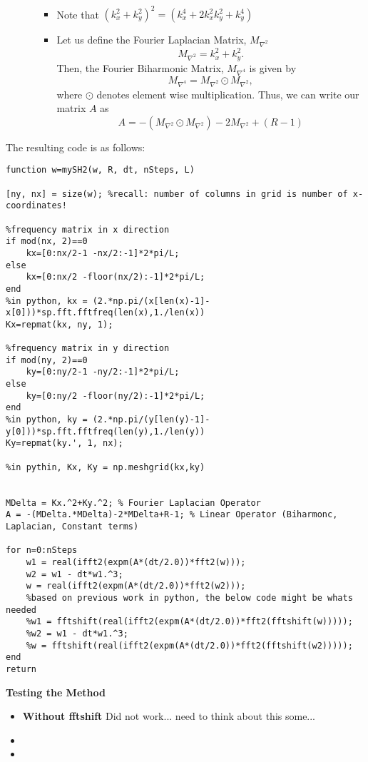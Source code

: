 \documentclass[12pt]{article}
\begin{document}
\begin{itemize}
\begin{enumerate}[(i)]
\begin{itemize}
\begin{multline*}
                \end{multline*}
            \item
                Note that $(k_x^2+k_y^2)^2 = (k_x^4+2k_x^2k_y^2+k_y^4)$
            \item
                Let us define the Fourier Laplacian Matrix, $M_{\nabla^2}$
                \[
                    M_{\nabla^2} = k_x^2+k_y^2.
                \] 
                Then, the Fourier Biharmonic Matrix, $M_{\nabla^4}$ is given by
                \[
                  M_{\nabla^4} = M_{\nabla^2} \odot M_{\nabla^2},
                \] 
                where $\odot$ denotes element wise multiplication.
                Thus, we can write our matrix $A$ as
                \[
                    A = -(M_{\nabla^2} \odot M_{\nabla^2})-2M_{\nabla^2}+(R-1)
                \] 
                \end{itemize}
        \end{enumerate}
\end{itemize}
The resulting code is as follows:
\begin{verbatim}
function w=mySH2(w, R, dt, nSteps, L)

[ny, nx] = size(w); %recall: number of columns in grid is number of x-coordinates!

%frequency matrix in x direction
if mod(nx, 2)==0
    kx=[0:nx/2-1 -nx/2:-1]*2*pi/L;
else
    kx=[0:nx/2 -floor(nx/2):-1]*2*pi/L;
end
%in python, kx = (2.*np.pi/(x[len(x)-1]-x[0]))*sp.fft.fftfreq(len(x),1./len(x))
Kx=repmat(kx, ny, 1);

%frequency matrix in y direction
if mod(ny, 2)==0
    ky=[0:ny/2-1 -ny/2:-1]*2*pi/L;
else
    ky=[0:ny/2 -floor(ny/2):-1]*2*pi/L;
end
%in python, ky = (2.*np.pi/(y[len(y)-1]-y[0]))*sp.fft.fftfreq(len(y),1./len(y))
Ky=repmat(ky.', 1, nx);

%in pythin, Kx, Ky = np.meshgrid(kx,ky)


MDelta = Kx.^2+Ky.^2; % Fourier Laplacian Operator
A = -(MDelta.*MDelta)-2*MDelta+R-1; % Linear Operator (Biharmonc, Laplacian, Constant terms)

for n=0:nSteps
    w1 = real(ifft2(expm(A*(dt/2.0))*fft2(w)));
    w2 = w1 - dt*w1.^3;
    w = real(ifft2(expm(A*(dt/2.0))*fft2(w2)));
    %based on previous work in python, the below code might be whats needed
    %w1 = fftshift(real(ifft2(expm(A*(dt/2.0))*fft2(fftshift(w)))));
    %w2 = w1 - dt*w1.^3;
    %w = fftshift(real(ifft2(expm(A*(dt/2.0))*fft2(fftshift(w2)))));
end
return
\end{verbatim}
\textbf{Testing the Method}
\begin{itemize}
    \item \textbf{Without fftshift} Did not work... need to think about this some...
    \item
    \item
\end{itemize}
\end{document}

